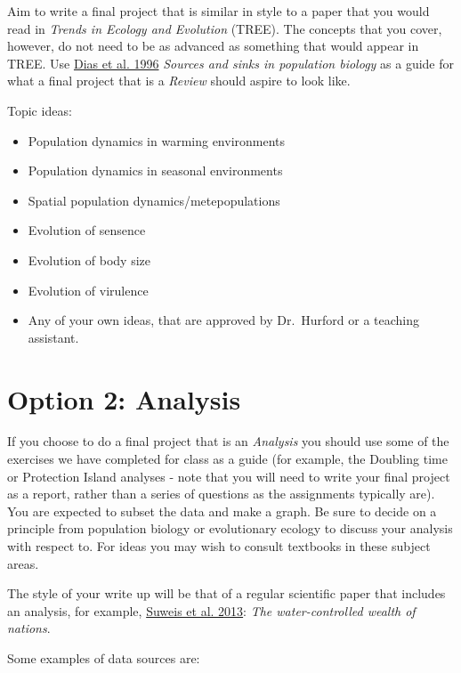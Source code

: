 \documentclass[]{book}
\begin{document}
Aim to write a final project that is similar in style to a paper that
you would read in \emph{Trends in Ecology and Evolution} (TREE). The
concepts that you cover, however, do not need to be as advanced as
something that would appear in TREE. Use
\href{https://www-sciencedirect-com.qe2a-proxy.mun.ca/science/article/pii/0169534796100379?via\%3Dihub}{Dias
et al. 1996} \emph{Sources and sinks in population biology} as a guide
for what a final project that is a \emph{Review} should aspire to look
like.

Topic ideas:

\begin{itemize}
\item
  Population dynamics in warming environments
\item
  Population dynamics in seasonal environments
\item
  Spatial population dynamics/metepopulations
\item
  Evolution of sensence
\item
  Evolution of body size
\item
  Evolution of virulence
\item
  Any of your own ideas, that are approved by Dr.~Hurford or a teaching
  assistant.
\end{itemize}

\section{Option 2: Analysis}\label{option-2-analysis}

If you choose to do a final project that is an \emph{Analysis} you
should use some of the exercises we have completed for class as a guide
(for example, the Doubling time or Protection Island analyses - note
that you will need to write your final project as a report, rather than
a series of questions as the assignments typically are). You are
expected to subset the data and make a graph. Be sure to decide on a
principle from population biology or evolutionary ecology to discuss
your analysis with respect to. For ideas you may wish to consult
textbooks in these subject areas.

The style of your write up will be that of a regular scientific paper
that includes an analysis, for example,
\href{https://www.pnas.org/content/110/11/4230}{Suweis et al. 2013}:
\emph{The water-controlled wealth of nations}.

Some examples of data sources are:
\end{document}
